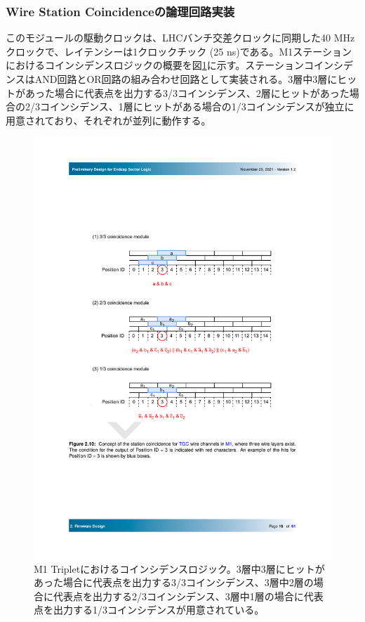 \subsubsection*{Wire Station Coincidenceの論理回路実装}
このモジュールの駆動クロックは、LHCバンチ交差クロックに同期した40 MHzクロックで、レイテンシーは1クロックチック (25 ns)である。M1ステーションにおけるコインシデンスロジックの概要を図\ref{StationCoin_wire}に示す。ステーションコインシデンスはAND回路とOR回路の組み合わせ回路として実装される。3層中3層にヒットがあった場合に代表点を出力する3/3コインシデンス、2層にヒットがあった場合の2/3コインシデンス、1層にヒットがある場合の1/3コインシデンスが独立に用意されており、それぞれが並列に動作する。

\begin{figure} 
    \centering
    \includegraphics[width=16cm]{fig/SL/StationCoin_wire.pdf}
    \caption[M1 Tripletにおけるコインシデンスロジック]{M1 Tripletにおけるコインシデンスロジック\cite{SLPDR}。3層中3層にヒットがあった場合に代表点を出力する3/3コインシデンス、3層中2層の場合に代表点を出力する2/3コインシデンス、3層中1層の場合に代表点を出力する1/3コインシデンスが用意されている。}
    \label{StationCoin_wire}
\end{figure}

